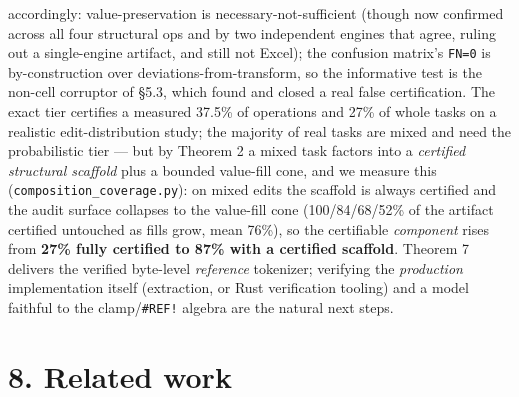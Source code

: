 \documentclass[
  11pt,
]{article}
\begin{document}
accordingly: value-preservation is necessary-not-sufficient (though now
confirmed across all four structural ops and by two independent engines
that agree, ruling out a single-engine artifact, and still not Excel);
the confusion matrix's \texttt{FN=0} is by-construction over
deviations-from-transform, so the informative test is the non-cell
corruptor of §5.3, which found and closed a real false certification.
The exact tier certifies a measured 37.5\% of operations and 27\% of
whole tasks on a realistic edit-distribution study; the majority of real
tasks are mixed and need the probabilistic tier --- but by Theorem 2 a
mixed task factors into a \emph{certified structural scaffold} plus a
bounded value-fill cone, and we measure this
(\texttt{composition\_coverage.py}): on mixed edits the scaffold is
always certified and the audit surface collapses to the value-fill cone
(100/84/68/52\% of the artifact certified untouched as fills grow, mean
76\%), so the certifiable \emph{component} rises from \textbf{27\% fully
certified to 87\% with a certified scaffold}. Theorem 7 delivers the
verified byte-level \emph{reference} tokenizer; verifying the
\emph{production} implementation itself (extraction, or Rust
verification tooling) and a model faithful to the clamp/\texttt{\#REF!}
algebra are the natural next steps.

\section{8. Related work}\label{related-work}
\end{document}
